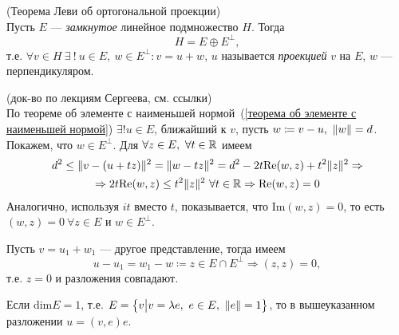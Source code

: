 \begin{theorem}
(Теорема Леви об ортогональной проекции)
~\\
Пусть $E$ --- \emph{замкнутое} линейное подмножество $H$. Тогда
$$H = E \oplus E^\perp,$$
т.е. $\forall v\in H~\exists~!~u\in E,~w\in E^\perp\colon v = u + w$, $u$ называется \emph{проекцией} $v$ на $E$, $w$ --- перпендикуляром.
\end{theorem}
\begin{proofocre}
(док-во по лекциям Сергеева, см. ссылки)~\\
\boxed{\exists}
По теореме об элементе с наименьшей нормой~(\eqref{теорема об элементе с наименьшей нормой}) $\exists!u\in E$, ближайший к $v$, пусть $w \coloneqq v - u,~\|w\|=d$. Покажем, что $w\in E^\perp$. Для $\forall z\in E,~\forall t\in{\mathbb{R}}$ имеем
\begin{multline*}
    d^2 \le \|v - (u + tz)\|^2 = \|w - tz\|^2 = d^2 - 2t\text{Re}(w, z) + t^2\|z\|^2 \Rightarrow\\
    \Rightarrow 2t\text{Re}(w, z) \le t^2\|z\|^2~\forall t\in{\mathbb{R}} \Rightarrow \text{Re}(w, z) = 0
\end{multline*}
Аналогично, используя $it$ вместо $t$, показывается, что $\text{Im}(w, z) = 0$, то есть\\ $(w, z) = 0~\forall z\in E$ и $w\in E^\perp$.

\boxed{!} Пусть $v = u_1 + w_1$ --- другое представление, тогда имеем
$$u - u_1 = w_1 - w \coloneqq z \in E\cap E^\perp \Rightarrow (z, z) = 0,$$
т.е. $z = 0$ и разложения совпадают.
\end{proofocre}

\begin{corollary}
Если $\text{dim}E = 1$, т.е. $E = \big\{ v \big| v = \lambda e,~e\in E,~\|e\| = 1  \big\}$, то в вышеуказанном разложении $u = (v,e)e$.
\end{corollary}




